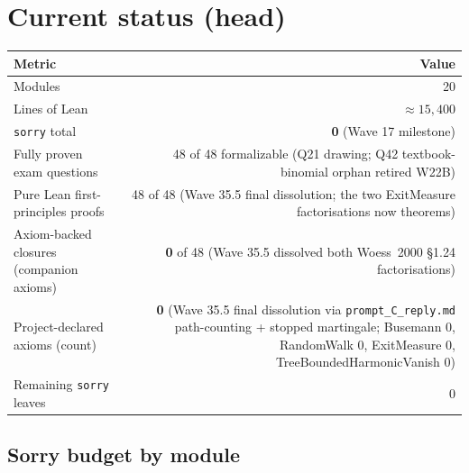 \documentclass[11pt,a4paper]{article}
\newcommand{\cmd}[1]{\texttt{\small #1}}
\theoremstyle{plain}
\theoremstyle{definition}
\begin{document}
\section{Current status (head)}

\begin{center}
\renewcommand{\arraystretch}{1.15}
\begin{tabular}{lr}
\toprule
\textbf{Metric} & \textbf{Value} \\
\midrule
Modules                                       & 20 \\
Lines of Lean                                 & $\approx 15{,}400$ \\
\cmd{sorry} total                             & \textbf{0} (Wave 17 milestone) \\
Fully proven exam questions                   & 48 of 48 formalizable (Q21 drawing; Q42 textbook-binomial orphan retired W22B) \\
Pure Lean first-principles proofs             & 48 of 48 (Wave 35.5 final dissolution; the two ExitMeasure factorisations now theorems) \\
Axiom-backed closures (companion axioms)      & \textbf{0} of 48 (Wave 35.5 dissolved both Woess~2000 \S1.24 factorisations) \\
Project-declared axioms (count)               & \textbf{0} (Wave 35.5 final dissolution via \texttt{prompt\_C\_reply.md} path-counting + stopped martingale; Busemann 0, RandomWalk 0, ExitMeasure 0, TreeBoundedHarmonicVanish 0) \\
Remaining \cmd{sorry} leaves                  & 0 \\
\bottomrule
\end{tabular}
\end{center}

\subsection{Sorry budget by module}
\end{document}
